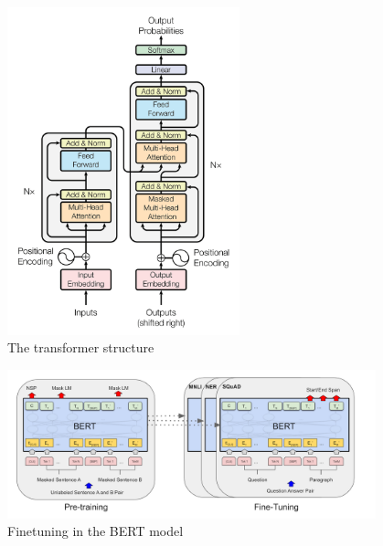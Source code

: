 \documentclass[runningheads]{llncs}
\begin{document}
  \begin{figure}[htbp]
      \centering
      \includegraphics[width=0.6\textwidth]{attention1.jpg}
      \caption{The transformer structure \cite{Vaswani17}}
      \label{fig:attention}
  \end{figure}
  \begin{figure}[]
    \centering
    \includegraphics[width=0.95\textwidth]{BERT Finetuning.png}
    \caption{Finetuning in the BERT model \cite{Devlin18}}
    \label{fig:bert_finetune}
  \end{figure}
\end{document}
